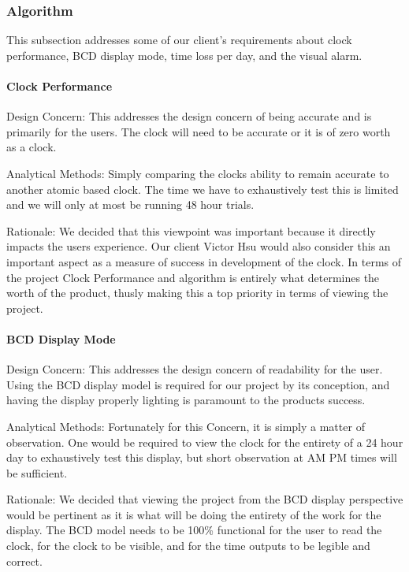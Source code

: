 \documentclass[onecolumn, draftclsnofoot,10pt, compsoc]{IEEEtran}
\begin{document}
\subsubsection{Algorithm}
This subsection addresses some of our client's requirements about clock performance, BCD display mode, time loss per day, and the visual alarm.

\paragraph{Clock Performance}
\vspace{2mm} Design Concern: This addresses the design concern of being accurate and is primarily for the users.
The clock will need to be accurate or it is of zero worth as a clock.

\vspace{2mm} Analytical Methods: Simply comparing the clocks ability to remain accurate to another atomic based clock.
The time we have to exhaustively test this is limited and we will only at most be running 48 hour trials.

\vspace{2mm} Rationale: We decided that this viewpoint was important because it directly impacts the users experience.
Our client Victor Hsu would also consider this an important aspect as a measure of success in development of the clock.
In terms of the project Clock Performance and algorithm is entirely what determines the worth of the product, thusly making this a top priority in terms of viewing the project.

\paragraph{BCD Display Mode}
\vspace{2mm} Design Concern: This addresses the design concern of readability for the user.
Using the BCD display model is required for our project by its conception, and having the display properly lighting is paramount to the products success.

\vspace{2mm} Analytical Methods: Fortunately for this Concern, it is simply a matter of observation.
One would be required to view the clock for the entirety of a 24 hour day to exhaustively test this display, but short observation at AM PM times will be sufficient.

\vspace{2mm} Rationale: We decided that viewing the project from the BCD display perspective would be pertinent as it is what will be doing the entirety of the work for the display.
The BCD model needs to be 100\% functional for the user to read the clock, for the clock to be visible, and for the time outputs to be legible and correct.
\end{document}
